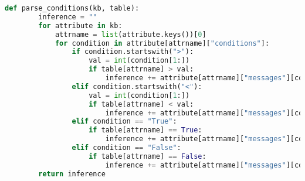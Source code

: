 \begin{lstlisting}[language=Python, caption={Knowledge base parser}, label={lst:kb-parser}]
	def parse_conditions(kb, table):
		inference = ""
		for attribute in kb:
			attrname = list(attribute.keys())[0]
			for condition in attribute[attrname]["conditions"]:
				if condition.startswith(">"):
					val = int(condition[1:])
					if table[attrname] > val:
						inference += attribute[attrname]["messages"][condition] + " "
				elif condition.startswith("<"):
					val = int(condition[1:])
					if table[attrname] < val:
						inference += attribute[attrname]["messages"][condition] + " "
				elif condition == "True":
					if table[attrname] == True:
						inference += attribute[attrname]["messages"][condition] + " "
				elif condition == "False":
					if table[attrname] == False:
						inference += attribute[attrname]["messages"][condition] + " "
		return inference
\end{lstlisting}